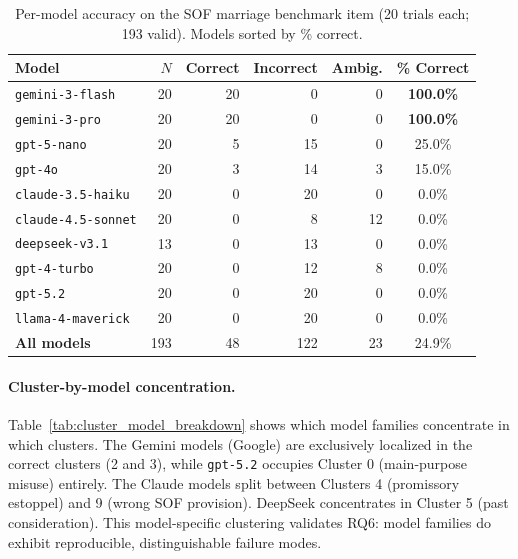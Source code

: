 \documentclass[11pt]{article}
\begin{document}
\begin{table}[ht]
\centering
\caption{Per-model accuracy on the SOF marriage benchmark item (20 trials each; 193 valid). Models sorted by \% correct.}
\label{tab:per_model_accuracy}
\begin{tabular}{lrrrrc}
\toprule
Model & $N$ & Correct & Incorrect & Ambig. & \% Correct \\
\midrule
\texttt{gemini-3-flash}        & 20 & 20 &  0 &  0 & \textbf{100.0\%} \\
\texttt{gemini-3-pro}          & 20 & 20 &  0 &  0 & \textbf{100.0\%} \\
\texttt{gpt-5-nano}            & 20 &  5 & 15 &  0 & 25.0\% \\
\texttt{gpt-4o}                & 20 &  3 & 14 &  3 & 15.0\% \\
\texttt{claude-3.5-haiku}      & 20 &  0 & 20 &  0 & 0.0\% \\
\texttt{claude-4.5-sonnet}     & 20 &  0 &  8 & 12 & 0.0\% \\
\texttt{deepseek-v3.1}         & 13 &  0 & 13 &  0 & 0.0\% \\
\texttt{gpt-4-turbo}           & 20 &  0 & 12 &  8 & 0.0\% \\
\texttt{gpt-5.2}               & 20 &  0 & 20 &  0 & 0.0\% \\
\texttt{llama-4-maverick}      & 20 &  0 & 20 &  0 & 0.0\% \\
\midrule
\textbf{All models}            & 193 & 48 & 122 & 23 & 24.9\% \\
\bottomrule
\end{tabular}
\end{table}

\paragraph{Cluster-by-model concentration.}
Table~\ref{tab:cluster_model_breakdown} shows which model families concentrate in which clusters. The Gemini models (Google) are exclusively localized in the correct clusters (2 and 3), while \texttt{gpt-5.2} occupies Cluster 0 (main-purpose misuse) entirely. The Claude models split between Clusters 4 (promissory estoppel) and 9 (wrong SOF provision). DeepSeek concentrates in Cluster 5 (past consideration). This model-specific clustering validates RQ6: model families do exhibit reproducible, distinguishable failure modes.
\end{document}
